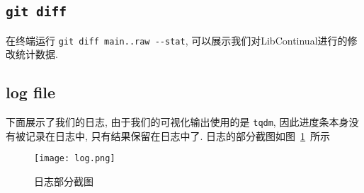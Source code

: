 \subsection{\texorpdfstring{\lstinline{git diff}}{git diff}}
在终端运行 \lstinline{git diff main..raw --stat}, 可以展示我们对LibContinual进行的修改统计数据.


\subsection{log file}
\label{sec:appendix-log}
下面展示了我们的日志, 由于我们的可视化输出使用的是 \lstinline{tqdm}, 因此进度条本身没有被记录在日志中, 只有结果保留在日志中了. 日志的部分截图如图~\ref{fig:log}~所示
\begin{figure}[H]
    \centering
    \texttt{[image: log.png]}
    \caption{日志部分截图}
    \label{fig:log}
\end{figure}
